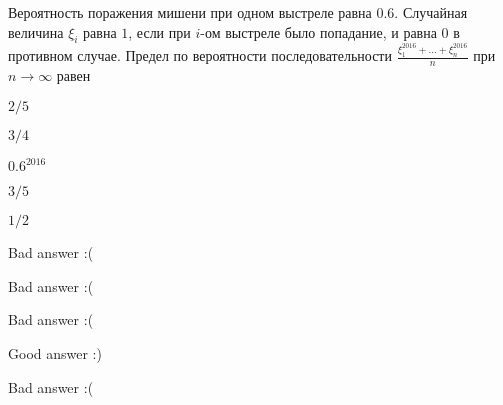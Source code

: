 
\begin{question}
Вероятность поражения мишени при одном выстреле равна \(0.6\). Случайная
величина \(\xi_i\) равна \(1\), если при \(i\)-ом выстреле было
попадание, и равна \(0\) в противном случае. Предел по вероятности
последовательности \(\frac{\xi_1^{2016} + \ldots + \xi_n^{2016}}{n}\)
при \(n \rightarrow \infty\) равен
\begin{answerlist}
  \item \(2/5\)
  \item \(3/4\)
  \item \(0.6^{2016}\)
  \item \(3/5\)
  \item \(1/2\)
\end{answerlist}
\end{question}

\begin{solution}
\begin{answerlist}
  \item Bad answer :(
  \item Bad answer :(
  \item Bad answer :(
  \item Good answer :)
  \item Bad answer :(
\end{answerlist}
\end{solution}

